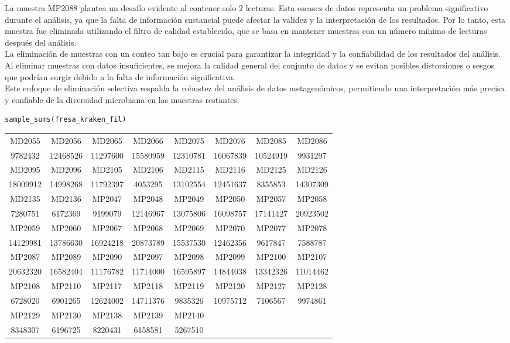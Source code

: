 La muestra MP2088 plantea un desafío evidente al contener solo 2 lecturas. Esta escasez de datos representa un problema significativo durante el análisis, ya que la falta de información sustancial puede afectar la validez y la interpretación de los resultados. Por lo tanto, esta muestra fue eliminada utilizando el filtro de calidad establecido, que se basa en mantener muestras con un número mínimo de lecturas después del análisis.\\

La eliminación de muestras con un conteo tan bajo es crucial para garantizar la integridad y la confiabilidad de los resultados del análisis. Al eliminar muestras con datos insuficientes, se mejora la calidad general del conjunto de datos y se evitan posibles distorsiones o sesgos que podrían surgir debido a la falta de información significativa.\\

Este enfoque de eliminación selectiva respalda la robustez del análisis de datos metagenómicos, permitiendo una interpretación más precisa y confiable de la diversidad microbiana en las muestras restantes.\\

\begin{lstlisting}[basicstyle=\small] 
sample_sums(fresa_kraken_fil)
\end{lstlisting}
\resizebox{0.9\textwidth}{!} {
\begin{tabular}{ c c c c c c c c }
MD2055 & MD2056 & MD2065 & MD2066 & MD2075 & MD2076 & MD2085 & MD2086 \\
9782432 & 12468526 & 11297600 & 15580959 & 12310781 & 16067839 & 10524919 & 9931297 \\
MD2095 & MD2096 & MD2105 & MD2106 & MD2115 & MD2116 & MD2125 & MD2126 \\
18009912 & 14998268 & 11792397 & 4053295 & 13102554 & 12451637 & 8355853 & 14307309 \\
MD2135 & MD2136 & MP2047 & MP2048 & MP2049 & MP2050 & MP2057 & MP2058 \\
7280751 & 6172369 & 9199079 & 12146967 & 13075806 & 16098757 & 17141427 & 20923502 \\
MP2059 & MP2060 & MP2067 & MP2068 & MP2069 & MP2070 & MP2077 & MP2078 \\
14129981 & 13786630 & 16924218 & 20873789 & 15537530 & 12462356 & 9617847 & 7588787 \\
MP2087 & MP2089 & MP2090 & MP2097 & MP2098 & MP2099 & MP2100 & MP2107 \\
20632320 & 16582404 & 11176782 & 11714000 & 16595897 & 14844038 & 13342326 & 11014462 \\
MP2108 & MP2110 & MP2117 & MP2118 & MP2119 & MP2120 & MP2127 & MP2128 \\
6728020 & 6901265 & 12624002 & 14711376 & 9835326 & 10975712 & 7106567 & 9974861 \\
MP2129 & MP2130 & MP2138 & MP2139 & MP2140 \\
8348307 & 6196725 & 8220431 & 6158581 & 5267510
\end{tabular}
}

